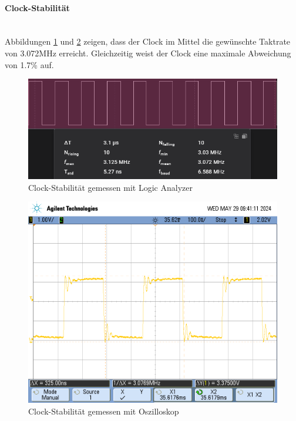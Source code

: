 \documentclass[12pt]{article}
\begin{document}
	\paragraph{Clock-Stabilität}\mbox{}\\
	Abbildungen \ref{fig:PDM_CLK_Jitter_Logic-Analyzer} und \ref{fig:PDM_CLK_Jitter_Oszilloskop} zeigen, dass der Clock im Mittel die gewünschte Taktrate von 3.072MHz erreicht. Gleichzeitig weist der Clock eine maximale Abweichung von 1.7\% auf.
	\begin{figure}[H]
		\centering
		\includegraphics[width=1\linewidth]{measurements/Timings/PDM_CLK_Jitter_Logic-Analyzer}
		\caption[]{Clock-Stabilität gemessen mit Logic Analyzer}
		\label{fig:PDM_CLK_Jitter_Logic-Analyzer}
	\end{figure}
	\begin{figure}[H]
		\centering
		\includegraphics[width=1\linewidth]{measurements/Timings/PDM_CLK_Jitter_Oszilloskop}
		\caption[]{Clock-Stabilität gemessen mit Oszilloskop}
		\label{fig:PDM_CLK_Jitter_Oszilloskop}
	\end{figure} \newpage
\end{document}
